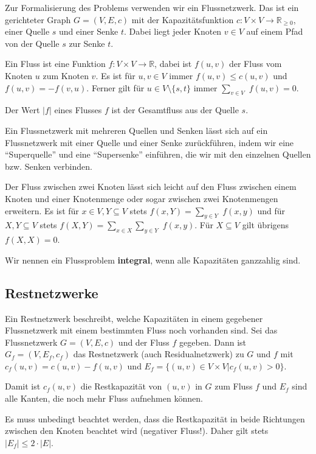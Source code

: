 \documentclass[12pt]{article}
\begin{document}
Zur Formalisierung des Problems verwenden wir ein Flussnetzwerk. Das ist ein gerichteter Graph $G = (V, E, c)$ mit der Kapazitätsfunktion $c : V \times V \rightarrow \mathbb{R}_{\geq 0}$, einer Quelle $s$ und einer Senke $t$. Dabei liegt jeder Knoten $v \in V$ auf einem Pfad von der Quelle $s$ zur Senke $t$.

Ein Fluss ist eine Funktion $f : V \times V \rightarrow \mathbb{R}$, dabei ist $f(u, v)$ der Fluss vom Knoten $u$ zum Knoten $v$. Es ist für $u, v \in V$ immer $f(u, v) \leq c(u, v)$ und $f(u, v) = -f(v, u)$.  Ferner gilt für $u \in V \setminus \{s, t\}$ immer $\sum_{v \in V}$ $f(u, v) = 0$.

Der Wert $|f|$ eines Flusses $f$ ist der Gesamtfluss aus der Quelle $s$.

Ein Flussnetzwerk mit mehreren Quellen und Senken lässt sich auf ein Flussnetzwerk mit einer Quelle und einer Senke zurückführen, indem wir eine \enquote{Superquelle} und eine \enquote{Supersenke} einführen, die wir mit den einzelnen Quellen bzw. Senken verbinden.

Der Fluss zwischen zwei Knoten lässt sich leicht auf den Fluss zwischen einem Knoten und einer Knotenmenge oder sogar zwischen zwei Knotenmengen erweitern. Es ist für $x \in V, Y \subseteq V$ stets $f(x, Y) = \sum_{y \in Y}$ $f(x, y)$ und für $X, Y \subseteq V$ stets $f(X, Y) = \sum_{x \in X} \sum_{y \in Y}$ $f(x, y)$. Für $X \subseteq V$ gilt übrigens $f(X, X) = 0$.

Wir nennen ein Flussproblem \textbf{integral}, wenn alle Kapazitäten ganzzahlig sind.

\subsection{Restnetzwerke}

Ein Restnetzwerk beschreibt, welche Kapazitäten in einem gegebener Flussnetzwerk mit einem bestimmten Fluss noch vorhanden sind. Sei das Flussnetzwerk $G = (V, E, c)$ und der Fluss $f$ gegeben. Dann ist $G_f = (V, E_f, c_f)$ das Restnetzwerk (auch Residualnetzwerk) zu $G$ und $f$ mit $c_f(u, v) = c(u, v) - f(u, v)$ und $E_f = \{(u, v) \in V \times V | c_f(u, v) > 0\}$.

Damit ist $c_f(u, v)$ die Restkapazität von $(u, v)$ in $G$ zum Fluss $f$ und $E_f$ sind alle Kanten, die noch mehr Fluss aufnehmen können.

Es muss unbedingt beachtet werden, dass die Restkapazität in beide Richtungen zwischen den Knoten beachtet wird (negativer Fluss!). Daher gilt stets $|E_f| \leq 2\cdot|E|$.
\end{document}
